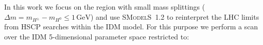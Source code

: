 \documentclass[preprint,number,sort&compress,twocolumn,3p]{elsstyarticle}
\newcommand{\Hn}{{H^0}}
\newcommand{\Hp}{{H^\pm}}
\newcommand{\smo}{\textsc{SModelS}}
\newcommand{\com}[1]{\emph{\color{red}[#1]}}  %
\begin{document}
In this work we focus on the region with small mass splittings ($\Delta m = m_{\Hp} - m_{\Hn} \le1\,\text{GeV}$) and use \smo~1.2 to reinterpret the LHC limits from HSCP searches within the IDM model. 
For this purpose we perform a scan over the IDM 5-dimensional parameter space restricted to:
%
%
%
%
%
%
\end{document}
